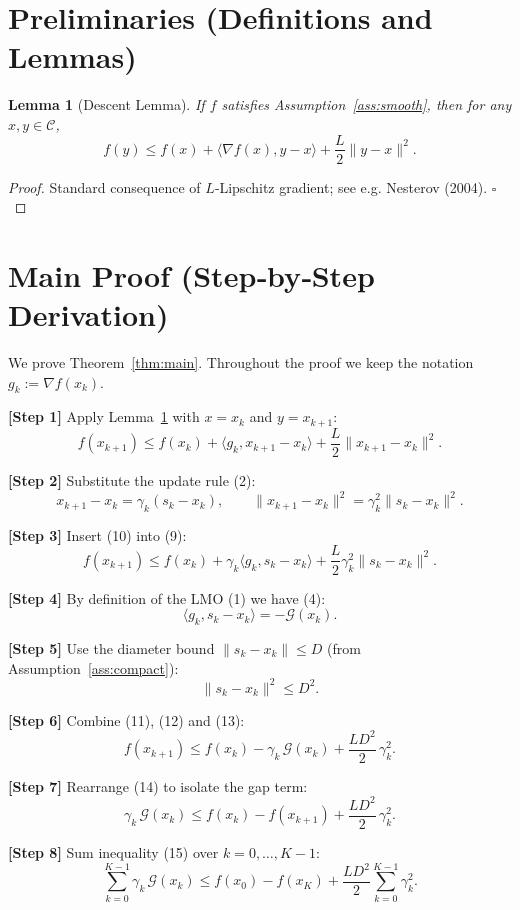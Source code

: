 \documentclass{article}
\newtheorem{lemma}{Lemma}
\newcommand{\gap}{\mathcal{G}}
\begin{document}
\newpage
\section*{Preliminaries (Definitions and Lemmas)}
\begin{lemma}[Descent Lemma]\label{lem:descent}
If $f$ satisfies Assumption~\ref{ass:smooth}, then for any $x,y\in\mathcal{C}$,
\[
f(y)\le f(x)+\langle\nabla f(x),y-x\rangle+\frac{L}{2}\|y-x\|^{2}.
\tag{8}
\]
\end{lemma}
\begin{proof}
Standard consequence of $L$‑Lipschitz gradient; see e.g. Nesterov (2004). \hfill $\square$
\end{proof}

\section*{Main Proof (Step‑by‑Step Derivation)}
We prove Theorem~\ref{thm:main}. Throughout the proof we keep the notation $g_{k}:=\nabla f(x_{k})$.

\bigskip
\noindent\textbf{[Step 1]} Apply Lemma~\ref{lem:descent} with $x=x_{k}$ and $y=x_{k+1}$:
\[
f(x_{k+1})\le f(x_{k})+\langle g_{k},x_{k+1}-x_{k}\rangle+\frac{L}{2}\|x_{k+1}-x_{k}\|^{2}.
\tag{9}
\]

\noindent\textbf{[Step 2]} Substitute the update rule (2):
\[
x_{k+1}-x_{k}= \gamma_{k}(s_{k}-x_{k}),
\qquad
\|x_{k+1}-x_{k}\|^{2}= \gamma_{k}^{2}\|s_{k}-x_{k}\|^{2}.
\tag{10}
\]

\noindent\textbf{[Step 3]} Insert (10) into (9):
\[
f(x_{k+1})\le f(x_{k})+\gamma_{k}\langle g_{k},s_{k}-x_{k}\rangle
        +\frac{L}{2}\gamma_{k}^{2}\|s_{k}-x_{k}\|^{2}.
\tag{11}
\]

\noindent\textbf{[Step 4]} By definition of the LMO (1) we have (4):
\[
\langle g_{k},s_{k}-x_{k}\rangle = -\gap(x_{k}).
\tag{12}
\]

\noindent\textbf{[Step 5]} Use the diameter bound $ \|s_{k}-x_{k}\|\le D $ (from Assumption~\ref{ass:compact}):
\[
\|s_{k}-x_{k}\|^{2}\le D^{2}.
\tag{13}
\]

\noindent\textbf{[Step 6]} Combine (11), (12) and (13):
\[
f(x_{k+1})\le f(x_{k}) - \gamma_{k}\,\gap(x_{k}) + \frac{L D^{2}}{2}\,\gamma_{k}^{2}.
\tag{14}
\]

\noindent\textbf{[Step 7]} Rearrange (14) to isolate the gap term:
\[
\gamma_{k}\,\gap(x_{k})
\le f(x_{k})-f(x_{k+1}) + \frac{L D^{2}}{2}\,\gamma_{k}^{2}.
\tag{15}
\]

\noindent\textbf{[Step 8]} Sum inequality (15) over $k=0,\dots,K-1$:
\[
\sum_{k=0}^{K-1}\gamma_{k}\,\gap(x_{k})
\le f(x_{0})-f(x_{K}) + \frac{L D^{2}}{2}\sum_{k=0}^{K-1}\gamma_{k}^{2}.
\tag{16}
\]
\end{document}
